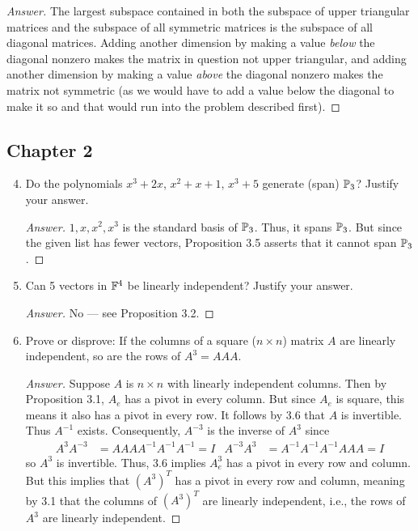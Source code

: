 \documentclass[../psets.tex]{subfiles}
\begin{document}
\begin{enumerate}[label={\textbf{7.\arabic*.}}]
\begin{proof}[Answer]
        The largest subspace contained in both the subspace of upper triangular matrices and the subspace of all symmetric matrices is the subspace of all diagonal matrices. Adding another dimension by making a value \emph{below} the diagonal nonzero makes the matrix in question not upper triangular, and adding another dimension by making a value \emph{above} the diagonal nonzero makes the matrix not symmetric (as we would have to add a value below the diagonal to make it so and that would run into the problem described first).
    \end{proof}
\end{enumerate}


\subsection*{Chapter 2}
\begin{enumerate}[label={\textbf{3.\arabic*.}}]
    \setcounter{enumi}{3}
    \item Do the polynomials $x^3+2x$, $x^2+x+1$, $x^3+5$ generate (span) $\mathbb{P}_3$? Justify your answer.
    \begin{proof}[Answer]
        $1,x,x^2,x^3$ is the standard basis of $\mathbb{P}_3$. Thus, it spans $\mathbb{P}_3$. But since the given list has fewer vectors, Proposition 3.5 asserts that it cannot span $\mathbb{P}_3$.
    \end{proof}
    \item Can 5 vectors in $\mathbb{F}^4$ be linearly independent? Justify your answer.
    \begin{proof}[Answer]
        No --- see Proposition 3.2.
    \end{proof}
    \item Prove or disprove: If the columns of a square ($n\times n$) matrix $A$ are linearly independent, so are the rows of $A^3=AAA$.
    \begin{proof}[Answer]
        Suppose $A$ is $n\times n$ with linearly independent columns. Then by Proposition 3.1, $A_e$ has a pivot in every column. But since $A_e$ is square, this means it also has a pivot in every row. It follows by 3.6 that $A$ is invertible. Thus $A^{-1}$ exists. Consequently, $A^{-3}$ is the inverse of $A^3$ since
        \begin{align*}
            A^3A^{-3} &= AAAA^{-1}A^{-1}A^{-1} = I&
            A^{-3}A^3 &= A^{-1}A^{-1}A^{-1}AAA = I
        \end{align*}
        so $A^3$ is invertible. Thus, 3.6 implies $A_e^3$ has a pivot in every row and column. But this implies that $(A^3)^T$ has a pivot in every row and column, meaning by 3.1 that the columns of $(A^3)^T$ are linearly independent, i.e., the rows of $A^3$ are linearly independent.
    \end{proof}
\end{enumerate}
\end{document}
